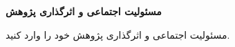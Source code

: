 %
%
%
%
%
%
\centerline{\textbf{\LARGE{
مسئولیت اجتماعی و اثرگذاری پژوهش
}}}
\thispagestyle{empty}
\vspace{1cm}

مسئولیت اجتماعی و اثرگذاری پژوهش خود را وارد کنید.